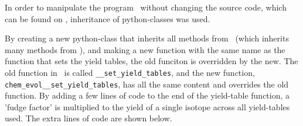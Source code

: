 
\label{sec:mod-omega}

In order to manipulate the program \omegamodel\ without changing the source code, which can be found on , inheritance of python-classes was used.

By creating a new python-class that inherits all methods from \omegamodel\ (which inherits many methods from \chemevol ), and making a new function with the same name as the function that sets the yield tables, the old funciton is overridden by the new.
The old function in \chemevol\ is called \verb|__set_yield_tables|, and the new function, \verb|chem_evol__set_yield_tables|, has all the same content and overrides the old function. By adding a few lines of code to the end of the yield-table function, a 'fudge factor' is multiplied to the yield of a single isotope across all yield-tables used.
The extra lines of code are shown below.

